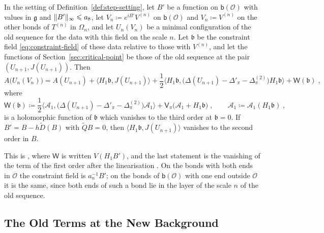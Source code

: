 \documentclass[11pt]{preprint}
\DeclarePairedDelimiter{\norm}{\lVert}{\rVert}
\numberwithin{equation}{section}
\begin{document}
\begin{proposition}\label{prop:action-fluctuation}
In the setting of Definition~\ref{def:step-setting}, let $B'$ be a function on $\mathsf b(\mathcal O)$ with values in $\mathfrak g$ and $\norm{B'}_\infty \leqslant a_8$, let $V_n \coloneqq e^{iB'}V^{(n)}$ on $\mathsf b(\mathcal O)$ and $V_n \coloneqq V^{(n)}$ on the other bonds of $T^{(n)}$ in $\Omega_n$, and let $U_n(V_n)$ be a minimal configuration of the old sequence for the data with this field on the scale $n$. Let $\mathfrak b$ be the constraint field \eqref{eq:constraint-field} of these data relative to those with $V^{(n)}$, and let the functions of Section~\ref{sec:critical-point} be those of the old sequence at the pair $(U_{n+1}, J(U_{n+1}))$. Then
\begin{equation}\label{eq:action-fluctuation}
    A\bigl(U_n(V_n)\bigr) = A(U_{n+1}) + \langle H_1\mathfrak b, J(U_{n+1})\rangle + \frac{1}{2}\bigl\langle H_1\mathfrak b, \bigl(\Delta(U_{n+1}) - \Delta'_\pi - \Delta^{(2)}_\pi\bigr)H_1\mathfrak b\bigr\rangle + \mathsf W(\mathfrak b)\;,
\end{equation}
where
\begin{equation}\label{eq:fluctuation-potential}
    \mathsf W(\mathfrak b) \coloneqq \frac{1}{2}\bigl\langle\mathcal A_1, \bigl(\Delta(U_{n+1}) - \Delta'_\pi - \Delta^{(2)}_\pi\bigr)\mathcal A_1\bigr\rangle + \mathsf V_\pi\bigl(\mathcal A_1 + H_1\mathfrak b\bigr)\;,
    \qquad
    \mathcal A_1 \coloneqq \mathcal A_1(H_1\mathfrak b)\;,
\end{equation}
is a holomorphic function of $\mathfrak b$ which vanishes to the third order at $\mathfrak b = 0$. If $B' = B - h\tilde D(B)$ with $\tilde QB = 0$, then $\langle H_1\mathfrak b, J(U_{n+1})\rangle$ vanishes to the second order in $B$.
\end{proposition}

This is \cite[(2.6)--(2.8), p.~266]{BalabanRG1}, where $\mathsf W$ is written $V(H_1B')$, and the last statement is the vanishing of the term of the first order after the linearisation \cite[p.~267]{BalabanRG1}. On the bonds with both ends in $\mathcal O$ the constraint field is $a_n^{-1}B'$; on the bonds of $\mathsf b(\mathcal O)$ with one end outside $\mathcal O$ it is the same, since both ends of such a bond lie in the layer of the scale $n$ of the old sequence.

\subsection{The Old Terms at the New Background}\label{sec:old-terms}
\end{document}
